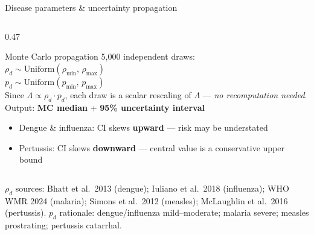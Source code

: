 \documentclass[aspectratio=169, 11pt]{beamer}
\begin{document}
\begin{frame}{Disease parameters \& uncertainty propagation}
\begin{columns}[T]
    \begin{column}{0.47\textwidth}
      \begin{block}{Monte Carlo propagation}
        \footnotesize
        5,000 independent draws:\\[3pt]
        \quad $\rho_d \sim \mathrm{Uniform}(\rho_{\min},\, \rho_{\max})$\\
        \quad $p_d    \sim \mathrm{Uniform}(p_{\min},\, p_{\max})$\\[5pt]
        Since $\Lambda \propto \rho_d \cdot p_d$, each draw is a
        scalar rescaling of $\Lambda$ —
        \textit{no recomputation needed}.\\[5pt]
        Output: \textbf{MC median} $+$ \textbf{95\% uncertainty interval}
      \end{block}
      \vspace{0.5em}
      \footnotesize
      \begin{itemize}
        \item Dengue \& influenza: CI skews \textbf{upward} —
              risk may be understated
        \item Pertussis: CI skews \textbf{downward} —
              central value is a conservative upper bound
      \end{itemize}
    \end{column}

  \end{columns}

  \vspace{0.4em}
  {\tiny
  $\rho_d$ sources: Bhatt et al.\ 2013 (dengue); Iuliano et al.\ 2018 (influenza);
  WHO WMR 2024 (malaria); Simons et al.\ 2012 (measles); McLaughlin et al.\ 2016 (pertussis).
  \quad $p_d$ rationale: dengue/influenza mild–moderate; malaria severe; measles prostrating; pertussis catarrhal.}

\end{frame}
\end{document}
